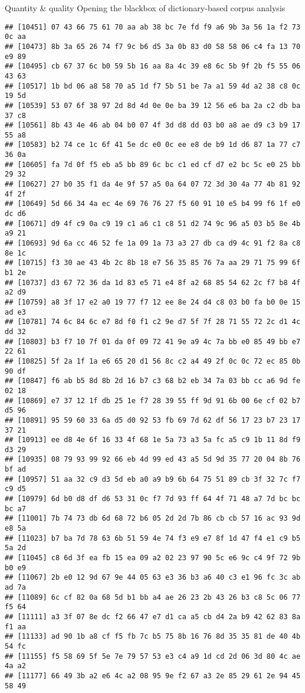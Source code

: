 \documentclass[
  ignorenonframetext,
]{beamer}
\begin{document}
\begin{frame}[fragile]{Quantity \& quality \textbar{} Opening the
blackbox of dictionary-based corpus analysis}
\begin{verbatim}
## [10451] 07 43 66 75 61 70 aa ab 38 bc 7e fd f9 a6 9b 3a 56 1a f2 73 0c aa
## [10473] 8b 3a 65 26 74 f7 9c b6 d5 3a 0b 83 d0 58 58 06 c4 fa 13 70 e9 89
## [10495] cb 67 37 6c b0 59 5b 16 aa 8a 4c 39 e8 6c 5b 9f 2b f5 55 06 43 63
## [10517] 1b bd 06 a8 58 70 a5 1d f7 5b 51 be 7a a1 59 4d a2 38 c8 0c 19 5d
## [10539] 53 07 6f 38 97 2d 8d 4d 0e 0e ba 39 12 56 e6 ba 2a c2 db ba 37 c8
## [10561] 8b 43 4e 46 ab 04 b0 07 4f 3d d8 dd 03 b0 a8 ae d9 c3 b9 17 55 a8
## [10583] b2 74 ce 1c 6f 41 5e dc e0 0c ee e8 de b9 1d d6 87 1a 77 c7 36 0a
## [10605] fa 7d 0f f5 eb a5 bb 89 6c bc c1 ed cf d7 e2 bc 5c e0 25 bb 29 32
## [10627] 27 b0 35 f1 da 4e 9f 57 a5 0a 64 07 72 3d 30 4a 77 4b 81 92 4f 2f
## [10649] 5d 66 34 4a ec 4e 69 76 76 27 f5 60 91 10 e5 b4 99 f6 1f e0 dc d6
## [10671] d9 4f c9 0a c9 19 c1 a6 c1 c8 51 d2 74 9c 96 a5 03 b5 8e 4b a9 21
## [10693] 9d 6a cc 46 52 fe 1a 09 1a 73 a3 27 db ca d9 4c 91 f2 8a c8 8e 1c
## [10715] f3 30 ae 43 4b 2c 8b 18 e7 56 35 85 76 7a aa 29 71 75 99 6f b1 2e
## [10737] d3 67 72 36 da 1d 83 e5 71 e4 8f a2 68 85 54 62 2c f7 b8 4f a2 d9
## [10759] a8 3f 17 e2 a0 19 77 f7 12 ee 8e 24 d4 c8 03 b0 fa b0 0e 15 ad e3
## [10781] 74 6c 84 6c e7 8d f0 f1 c2 9e d7 5f 7f 28 71 55 72 2c d1 4c dd 32
## [10803] b3 f7 10 7f 01 da 0f 09 72 41 9e a9 4c 7a bb e0 85 49 bb e7 22 61
## [10825] 5f 2a 1f 1a e6 65 20 d1 56 8c c2 a4 49 2f 0c 0c 72 ec 85 0b 90 df
## [10847] f6 ab b5 8d 8b 2d 16 b7 c3 68 b2 eb 34 7a 03 bb cc a6 9d fe 02 18
## [10869] e7 37 12 1f db 25 1e f7 28 39 55 ff 9d 91 6b 00 6e cf 02 b7 d5 96
## [10891] 95 59 60 33 6a d5 d0 92 53 fb 69 7d 62 df 56 17 23 b7 23 17 37 21
## [10913] ee d8 4e 6f 16 33 4f 68 1e 5a 73 a3 5a fc a5 c9 1b 11 8d f9 d3 29
## [10935] 08 79 93 99 92 66 eb 4d 99 ed 43 a5 5d 9d 35 77 20 04 8b 76 bf ad
## [10957] 51 aa 32 c9 d3 5d eb a0 a9 b9 6b 64 75 51 89 cb 3f 32 7c f7 c9 d5
## [10979] 6d b0 d8 df d6 53 31 0c f7 7d 93 ff 64 4f 71 48 a7 7d bc bc bc a7
## [11001] 7b 74 73 db 6d 68 72 b6 05 2d 2d 7b 86 cb cb 57 16 ac 93 9d e8 5a
## [11023] b7 ba 7d 78 63 6b 51 59 4e 74 f3 e9 e7 8f 1d 47 f4 e1 c9 b5 5a 2d
## [11045] c8 6d 3f ea fb 15 ea 09 a2 02 23 97 90 5c e6 9c c4 9f 72 9b b0 e9
## [11067] 2b e0 12 9d 67 9e 44 05 63 e3 36 b3 a6 40 c3 e1 96 fc 3c ab ad 7a
## [11089] 6c cf 82 0a 68 5d b1 bb a4 ae 26 23 2b 43 26 b3 c8 5c 06 77 f5 64
## [11111] a3 3f 07 8e dc f2 66 47 e7 d1 ca a5 cb d4 2a b9 42 62 83 8a f1 aa
## [11133] ad 90 1b a8 cf f5 fb 7c b5 75 8b 16 76 8d 35 35 81 de 40 4b 54 fc
## [11155] f5 58 69 5f 5e 7e 79 57 53 e3 c4 a9 1d cd 2d 06 3d 80 4c ae 4a a2
## [11177] 66 49 3b a2 e6 4c a2 08 95 9e f2 67 a3 2e 85 29 61 2e 94 45 58 49

\end{verbatim}
\end{frame}
\end{document}
